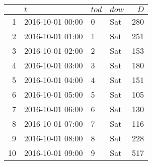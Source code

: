\begin{tabular}{rlllr}
  & $\mathit{t}$ & $\mathit{tod}$ & $\mathit{dow}$ & $\mathit{D}$ \\ 
  \hline
\hline
1 & 2016-10-01 00:00 & 0 & Sat & 280 \\ 
   \hline
2 & 2016-10-01 01:00 & 1 & Sat & 251 \\ 
   \hline
3 & 2016-10-01 02:00 & 2 & Sat & 153 \\ 
   \hline
4 & 2016-10-01 03:00 & 3 & Sat & 180 \\ 
   \hline
5 & 2016-10-01 04:00 & 4 & Sat & 151 \\ 
   \hline
6 & 2016-10-01 05:00 & 5 & Sat & 105 \\ 
   \hline
7 & 2016-10-01 06:00 & 6 & Sat & 130 \\ 
   \hline
8 & 2016-10-01 07:00 & 7 & Sat & 116 \\ 
   \hline
9 & 2016-10-01 08:00 & 8 & Sat & 228 \\ 
   \hline
10 & 2016-10-01 09:00 & 9 & Sat & 517 \\ 
  \end{tabular}
